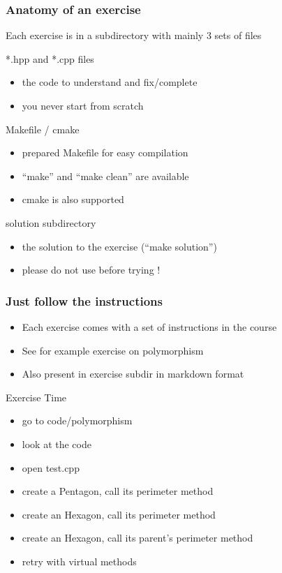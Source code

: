 \documentclass[compress]{beamer}
\begin{document}
\begin{frame}
  \frametitle{Anatomy of an exercise}
  Each exercise is in a subdirectory with mainly 3 sets of files
  \begin{exampleblock}{*.hpp and *.cpp files}
    \begin{itemize}
    \item the code to understand and fix/complete
    \item you never start from scratch
    \end{itemize}
  \end{exampleblock}
  \begin{block}{Makefile / cmake}
    \begin{itemize}
    \item prepared Makefile for easy compilation
    \item ``make'' and ``make clean'' are available
    \item cmake is also supported
    \end{itemize}
  \end{block}
  \begin{alertblock}{solution subdirectory}
    \begin{itemize}
    \item the solution to the exercise (``make solution'')
    \item please do not use before trying !
    \end{itemize}
  \end{alertblock}
\end{frame}

\begin{frame}
  \frametitle{Just follow the instructions}
  \begin{itemize}
  \item Each exercise comes with a set of instructions in the course
  \item See for example exercise on polymorphism
  \item Also present in exercise subdir in markdown format
  \end{itemize}
  \begin{alertblock}{Exercise Time}
    \begin{itemize}
    \item go to code/polymorphism
    \item look at the code
    \item open test.cpp
    \item create a Pentagon, call its perimeter method
    \item create an Hexagon, call its perimeter method
    \item create an Hexagon, call its parent's perimeter method
    \item retry with virtual methods
    \end{itemize}
  \end{alertblock}
\end{frame}
\end{document}
